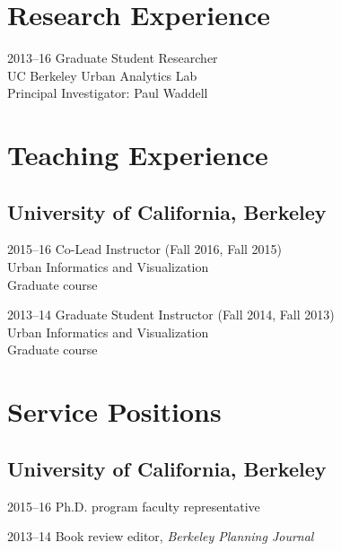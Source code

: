 \documentclass{academiccv}
\begin{document}
\section*{Research Experience}

\begin{tablist}
\item[2013--16] \tab Graduate Student Researcher \\
                     UC Berkeley Urban Analytics Lab \\
                     Principal Investigator: Paul Waddell
\end{tablist}



\section*{Teaching Experience}

\subsection*{University of California, Berkeley}

\begin{tablist}
\item[2015--16] \tab Co-Lead Instructor (Fall 2016, Fall 2015) \\
                     Urban Informatics and Visualization \\
                     Graduate course
\item[2013--14] \tab Graduate Student Instructor (Fall 2014, Fall 2013) \\
                     Urban Informatics and Visualization \\
                     Graduate course
\end{tablist}



\section*{Service Positions}

\subsection*{University of California, Berkeley}

\begin{tablist}
\item[2015--16] \tab Ph.D. program faculty representative
\item[2013--14] \tab Book review editor, \emph{Berkeley Planning Journal}
\end{tablist}
\end{document}
